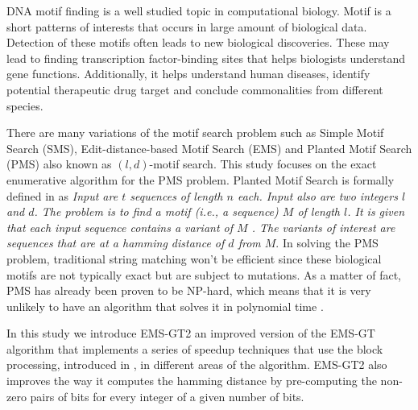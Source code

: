
DNA motif finding is a well studied topic in computational biology. Motif is a short patterns of interests that occurs in large amount of biological data. Detection of these motifs often leads to new biological discoveries. These may lead to finding transcription factor-binding sites that helps biologists understand gene functions. Additionally, it helps understand human diseases, identify potential therapeutic drug target and conclude commonalities from different species.

There are many variations of the motif search problem such as Simple Motif Search (SMS), Edit-distance-based Motif Search (EMS) and Planted Motif Search (PMS) also known as $(l, d)$-motif search. This study focuses on the exact enumerative algorithm for the PMS problem. Planted Motif Search is formally defined in \cite{ExactAlgorithmsPMS} as \emph{Input are $t$ sequences of length $n$ each. Input also are two integers $l$ and $d$. The problem is to find a motif (i.e., a sequence) $M$ of length $l$. It is given that each input sequence contains a variant of $M$ . The variants of interest are sequences that are at a hamming distance of $d$ from $M$}. In solving the PMS problem, traditional string matching won't be efficient since these biological motifs are not typically exact but are subject to mutations. As a matter of fact, PMS has already been proven to be NP-hard, which means that it is very unlikely to have an algorithm that solves it in polynomial time \cite{Evans2003407}.

In this study we introduce EMS-GT2 an improved version of the EMS-GT algorithm that implements a series of speedup techniques that use the block processing, introduced in \cite{sia2015}, in different areas of the algorithm. EMS-GT2 also improves the way it computes the hamming distance by pre-computing the non-zero pairs of bits for every integer of a given number of bits.
